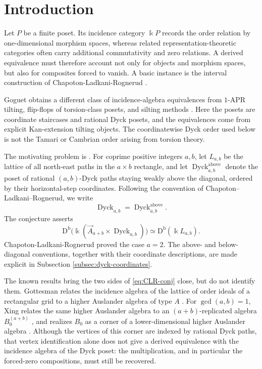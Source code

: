 \documentclass[12pt,a4paper,english,reqno]{amsart}
\theoremstyle{plain}
\theoremstyle{definition}
\newcommand{\kk}{\Bbbk}
\newcommand{\Db}{\mathrm D^{\mathrm b}}
\newcommand{\Dyck}{\operatorname{Dyck}}
\begin{document}
\section{Introduction}
Let $P$ be a finite poset.  Its incidence category $\kk P$ records the
order relation by one-dimensional morphism spaces, whereas related
representation-theoretic categories often carry additional commutativity and
zero relations.  A derived equivalence must therefore account not only for
objects and morphism spaces, but also for composites forced to vanish.  A
basic instance is the interval construction of Chapoton-Ladkani-Rognerud
\cite{CLR}.

Goguet obtains a different class of incidence-algebra equivalences from
$1$-APR tilting, flip-flops of torsion-class posets, and silting methods
\cite[Theorems~1 and~2]{Goguet}.  Here the posets are coordinate staircases
and rational Dyck posets, and the equivalences come from explicit
Kan-extension tilting objects.  The coordinatewise Dyck order used below is
not the Tamari or Cambrian order arising from torsion theory.

The motivating problem is \cite[Conjecture~3.7]{CLR}.  For coprime
positive integers $a,b$, let $L_{a,b}$ be the lattice of all north-east
paths in the $a\times b$ rectangle, and let 
$\Dyck^{\mathrm{above}}_{a,b}$ denote the poset of rational
$(a,b)$-Dyck paths staying weakly above the diagonal, ordered by their
horizontal-step coordinates.  Following the convention of
Chapoton--Ladkani--Rognerud, we write
\[
\Dyck_{a,b}
=
\Dyck^{\mathrm{above}}_{a,b}.
\]
The conjecture asserts
\begin{equation}
 \Db\!\bigl(\kk(\vec A_{a+b}\times\Dyck_{a,b})\bigr)
 \simeq \Db(\kk L_{a,b}).
\label{eq:CLR-conj}
\end{equation}
Chapoton-Ladkani-Rognerud proved the case $a=2$.  The above- and
below-diagonal conventions, together with their coordinate descriptions, are
made explicit in Subsection \ref{subsec:dyck-coordinates}.

The known results bring the two sides of \eqref{eq:CLR-conj} close, but do not
identify them.  Gottesman relates the incidence algebra of the lattice of
order ideals of a rectangular grid to a higher Auslander algebra of type
$A$ \cite[Theorem~E]{Gottesman}.  For $\gcd(a,b)=1$, Xing relates the same
higher Auslander algebra to an $(a+b)$-replicated algebra $B_0^{(a+b)}$
\cite[Theorem~4.5 and Proposition~4.25]{Xing}, and realizes $B_0$ as a corner
of a lower-dimensional higher Auslander algebra
\cite[Proposition~4.33]{Xing}.  Although the vertices of this corner are
indexed by rational Dyck paths, that vertex identification alone does not
give a derived equivalence with the incidence algebra of the Dyck poset: the
multiplication, and in particular the forced-zero compositions, must still
be recovered.
\end{document}
